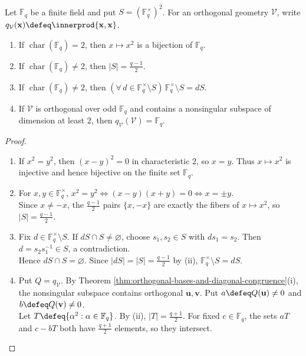 \begin{proposition} \label{prop:finite-field-square-classes-and-universality} \\
Let $\mathbb{F}_q$ be a finite field and put $S=(\mathbb{F}_q^{\times})^2$. For an orthogonal geometry $\mathcal{V}$, write $q_{\mathcal{V}}(\mathbf{x})\defeq\innerprod{\mathbf{x},\mathbf{x}}$.
\begin{enumerate}[label=(\roman*)]
\setlength{\itemsep}{0pt}
\item If $\operatorname{char}(\mathbb{F}_q)=2$, then $x\mapsto x^2$ is a bijection of $\mathbb{F}_q$.
\item If $\operatorname{char}(\mathbb{F}_q)\neq2$, then $|S|=\frac{q-1}{2}$.
\item If $\operatorname{char}(\mathbb{F}_q)\neq2$, then $(\forall\,d\in\mathbb{F}_q^{\times}\setminus S)\,\mathbb{F}_q^{\times}\setminus S=dS$.
\item If $\mathcal{V}$ is orthogonal over odd $\mathbb{F}_q$ and contains a nonsingular subspace of dimension at least $2$, then $q_{\mathcal{V}}(\mathcal{V})=\mathbb{F}_q$.
\end{enumerate}
\begin{proof}
\begin{enumerate}[label=(\roman*)]
\setlength{\itemsep}{0pt}
\item If $x^2=y^2$, then $(x-y)^2=0$ in characteristic $2$, so $x=y$. Thus $x\mapsto x^2$ is injective and hence bijective on the finite set $\mathbb{F}_q$.
\item For $x,y\in\mathbb{F}_q^{\times}$, $x^2=y^2\Longleftrightarrow(x-y)(x+y)=0\Longleftrightarrow x=\pm y$.\\
Since $x\neq-x$, the $\frac{q-1}{2}$ pairs $\{x,-x\}$ are exactly the fibers of $x\mapsto x^2$, so $|S|=\frac{q-1}{2}$.
\item Fix $d\in\mathbb{F}_q^{\times}\setminus S$. If $dS\cap S\neq\varnothing$, choose $s_1,s_2\in S$ with $ds_1=s_2$. Then $d=s_2s_1^{-1}\in S$, a contradiction.\\
Hence $dS\cap S=\varnothing$. Since $|dS|=|S|=\frac{q-1}{2}$ by (ii), $\mathbb{F}_q^{\times}\setminus S=dS$.
\item Put $Q=q_{\mathcal{V}}$. By Theorem \ref{thm:orthogonal-bases-and-diagonal-congruence}(i), the nonsingular subspace contains orthogonal $\mathbf{u},\mathbf{v}$. Put $a\defeq Q(\mathbf{u})\neq0$ and $b\defeq Q(\mathbf{v})\neq0$.\\
Let $T\defeq\{\alpha^2:\alpha\in\mathbb{F}_q\}$. By (ii), $|T|=\frac{q+1}{2}$. For fixed $c\in\mathbb{F}_q$, the sets $aT$ and $c-bT$ both have $\frac{q+1}{2}$ elements, so they intersect.\\

\end{enumerate}
\end{proof}
\end{proposition}
